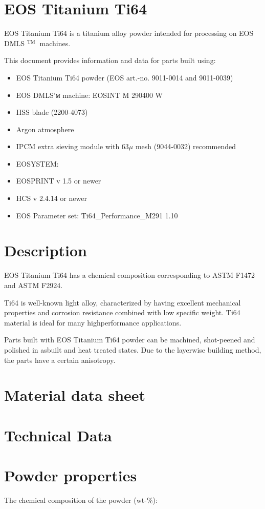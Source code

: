 \documentclass[10pt]{article}
\begin{document}
\section*{EOS Titanium Ti64}
EOS Titanium Ti64 is a titanium alloy powder intended for processing on EOS DMLS ${ }^{\text {TM }}$ machines.

This document provides information and data for parts built using:

\begin{itemize}
  \item EOS Titanium Ti64 powder (EOS art.-no. 9011-0014 and 9011-0039)
  \item EOS DMLS'м machine: EOSINT M 290400 W
  \item HSS blade (2200-4073)
  \item Argon atmosphere
  \item IPCM extra sieving module with $63 \mu$ mesh (9044-0032) recommended
  \item EOSYSTEM:
  \item EOSPRINT v 1.5 or newer
  \item HCS v 2.4.14 or newer
  \item EOS Parameter set: Ti64\_Performance\_M291 1.10
\end{itemize}

\section*{Description}
EOS Titanium Ti64 has a chemical composition corresponding to ASTM F1472 and ASTM F2924.

Ti64 is well-known light alloy, characterized by having excellent mechanical properties and corrosion resistance combined with low specific weight. Ti64 material is ideal for many highperformance applications.

Parts built with EOS Titanium Ti64 powder can be machined, shot-peened and polished in asbuilt and heat treated states. Due to the layerwise building method, the parts have a certain anisotropy.

\section*{Material data sheet}
\section*{Technical Data}
\section*{Powder properties}
The chemical composition of the powder (wt-\%):
\end{document}
